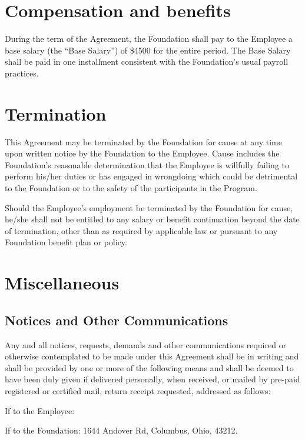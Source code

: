 \documentclass{ross}
\begin{document}
\section{Compensation and benefits}

During the term of the Agreement, the Foundation shall pay to the
Employee a base salary (the ``Base Salary'') of \$4500 for the entire
period.  The Base Salary shall be paid in one installment consistent with
the Foundation's usual payroll practices.

\section{Termination}

This Agreement may be terminated by the Foundation for cause at any time upon written notice by the Foundation to the Employee.  Cause includes the Foundation's reasonable determination that the Employee is willfully failing to perform his/her duties or has engaged in wrongdoing which could be detrimental to the Foundation or to the safety of the participants in the Program.

Should the Employee's employment be terminated by the Foundation for cause, he/she shall not be entitled to any salary or benefit continuation beyond the date of termination, other than as required by applicable law or pursuant to any Foundation benefit plan or policy.

\section{Miscellaneous}

\subsection{Notices and Other Communications}

Any and all notices, requests, demands and other communications required or 
otherwise contemplated to be made under this Agreement shall be in writing 
and shall be provided by one or more of the following means and shall be 
deemed to have been duly given  if delivered personally, when received, 
or mailed by pre-paid registered or certified mail, return receipt requested, 
addressed as follows:

If to the Employee: 

If to the Foundation: 1644 Andover Rd, Columbus, Ohio, 43212.
\end{document}
